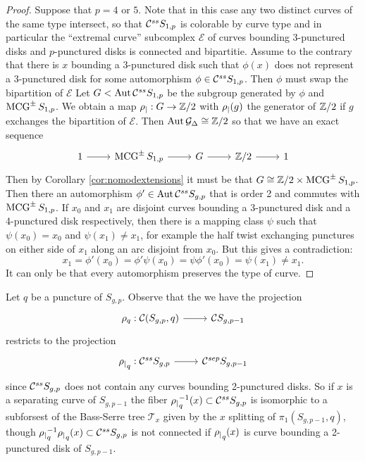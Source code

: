 \begin{proof}
    Suppose that $p = 4$ or $5$.
    Note that in this case any two distinct curves of the same type intersect,
    so that $ \mathcal C^{{ss}}  S_{1,p}$ is colorable by curve type and in particular the ``extremal curve'' subcomplex
    $\mathcal E$ of curves bounding 3-punctured disks and $p$-punctured disks is connected and bipartitie.
    Assume to the contrary that there is $x$ bounding a 3-punctured disk such that $\phi(x)$ does not represent a 3-punctured disk for some automorphism $\phi \in  \mathcal C^{{ss}}  S_{1,p}$.
    Then $\phi$ must swap the bipartition of $\mathcal E$
    Let $G < \operatorname{Aut}  \mathcal C^{{ss}}  S_{1,p}$ be the subgroup generated by $\phi$ and $\operatorname{MCG}^{\pm} S_{1,p}$.
    We obtain a map ${\rho_|}:G \to \mathbb{Z}/2$ with ${\rho_|}(g)$ the generator of $\mathbb{Z}/2$ if $g$ exchanges the bipartition of $\mathcal E$.
    Then $\operatorname{Aut} \mathcal G_\Delta \cong \mathbb{Z}/2$ so that we have an exact sequence
    $$
    \begin{tikzcd}
      1 \arrow{r} &
      \mcg^{\pm} S_{1,p} \arrow{r} &
      G \arrow{r} &
      \Z/2 \arrow{r} &
      1
    \end{tikzcd}
    $$
    Then by Corollary \ref{cor:nomodextensions} it must be that $G \cong \mathbb{Z}/2 \times   \operatorname{MCG}^{\pm} S_{1,p}$.
    Then there an automorphism $\phi' \in \operatorname{Aut}  \mathcal C^{{ss}}  S_{g,p}$ that is order 2 and commutes with $\operatorname{MCG}^{\pm} S_{1,p}$.
    If
    $x_0$ and $x_1$ are disjoint curves bounding a 3-punctured disk and a 4-punctured disk respectively,
    then
     there is a mapping class $\psi$ such that $\psi(x_0) = x_0$
    and $\psi(x_1) \neq x_1$, for example the half twist exchanging punctures on either side of $x_1$ along an arc disjoint from $x_0$.
    But this gives a contradiction:
    $$x_1=\phi'(x_0) =\phi'\psi(x_0) = \psi \phi' (x_0) = \psi(x_1)\neq x_1.$$
    It can only be that every automorphism preserves the type of curve.
\end{proof}

\begin{remark}
  Let $q$ be a puncture of $S_{g,p}$.
  Observe that the
  we have the projection
  $$
  \begin{tikzcd}
  \rho_q: \mathcal C(S_{g,p},q) \arrow{r}& \mathcal C S_{g,p-1}
  \end{tikzcd}
  $$
  restricts to the projection
  $$
  \begin{tikzcd}
    \rrho_q: \css S_{g,p} \arrow{r}& \csep S_{g,p-1}
  \end{tikzcd}
  $$
  since $ \mathcal C^{{ss}}  S_{g,p}$ does not contain any curves bounding 2-punctured disks.
  So if $x$ is a separating curve of $S_{g,p-1}$
  the fiber ${\rho_|}^{-1}_q(x) \subset  \mathcal C^{{ss}}  S_{g,p}$ is
  isomorphic to a subforsest of the Bass-Serre tree $\mathcal T_x$
  given by the $x$ splitting of $\pi_1(S_{g,p-1},q)$,
  though ${\rho_|}_q^{-1}{\rho_|}_q (x) \subset  \mathcal C^{{ss}}  S_{g,p}$ is not connected
  if ${\rho_|}_q(x)$ is curve bounding a 2-punctured disk of $S_{g,p-1}$.
\end{remark}

